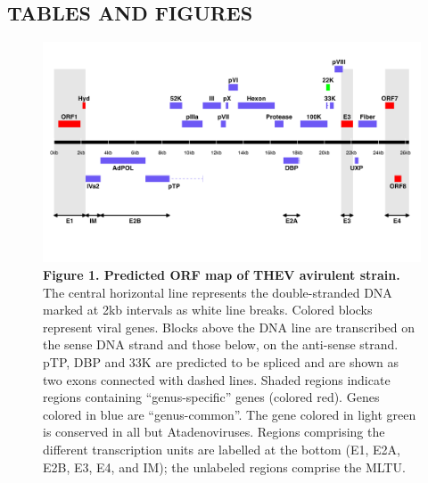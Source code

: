 \documentclass[
]{article}
\begin{document}
\newpage

\subsection{TABLES AND FIGURES}\label{tables-and-figures}

\begin{figure}
\centering
\includegraphics{results/r/figures/thev_orf_map.png}
\caption{\textbf{Figure 1. Predicted ORF map of THEV avirulent strain.}
The central horizontal line represents the double-stranded DNA marked at
2kb intervals as white line breaks. Colored blocks represent viral
genes. Blocks above the DNA line are transcribed on the sense DNA strand
and those below, on the anti-sense strand. pTP, DBP and 33K are
predicted to be spliced and are shown as two exons connected with dashed
lines. Shaded regions indicate regions containing ``genus-specific''
genes (colored red). Genes colored in blue are ``genus-common''. The
gene colored in light green is conserved in all but Atadenoviruses.
Regions comprising the different transcription units are labelled at the
bottom (E1, E2A, E2B, E3, E4, and IM); the unlabeled regions comprise
the MLTU.}
\end{figure}
\end{document}
